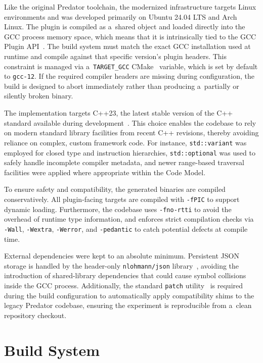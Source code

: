\documentclass[xpsejal00-gcc-plugin.tex]{subfiles}
\begin{document}
Like the original Predator toolchain, the modernized infrastructure targets Linux environments and was developed primarily on Ubuntu 24.04 LTS and Arch Linux.
The plugin is compiled as a~shared object and loaded directly into the GCC process memory space, which means that it is intrinsically tied to the GCC Plugin API~\cite{GCCInternals}.\@
The build system must match the exact GCC installation used at runtime and compile against that specific version's plugin headers.
This constraint is managed via a~\texttt{TARGET\_GCC} CMake~\cite{CMake} variable, which is set by default to \texttt{gcc-12}.
If the required compiler headers are missing during configuration, the build is designed to abort immediately rather than producing a~partially or silently broken binary.

The implementation targets C++23, the latest stable version of the C++ standard available during development~\cite{gccCxxStatus}.
This choice enables the codebase to rely on modern standard library facilities from recent C++ revisions, thereby avoiding reliance on complex, custom framework code.
For instance, \texttt{std::variant} was employed for closed type and instruction hierarchies, \texttt{std::optional} was used to safely handle incomplete compiler metadata, and newer range-based traversal facilities were applied where appropriate within the Code Model.

To ensure safety and compatibility, the generated binaries are compiled conservatively.
All plugin-facing targets are compiled with \texttt{-fPIC} to support dynamic loading.
Furthermore, the codebase uses \texttt{-fno-rtti} to avoid the overhead of runtime type information, and enforces strict compilation checks via \texttt{-Wall}, \texttt{-Wextra}, \texttt{-Werror}, and \texttt{-pedantic} to catch potential defects at compile time.

External dependencies were kept to an absolute minimum.
Persistent JSON storage is handled by the header-only \texttt{nlohmann/json} library~\cite{nlohmannJson}, avoiding the introduction of shared-library dependencies that could cause symbol collisions inside the GCC process.
Additionally, the standard \texttt{patch} utility~\cite{Patch} is required during the build configuration to automatically apply compatibility shims to the legacy Predator codebase, ensuring the experiment is reproducible from a~clean repository checkout.

\section{Build System}\label{sec:build-system}
\end{document}
